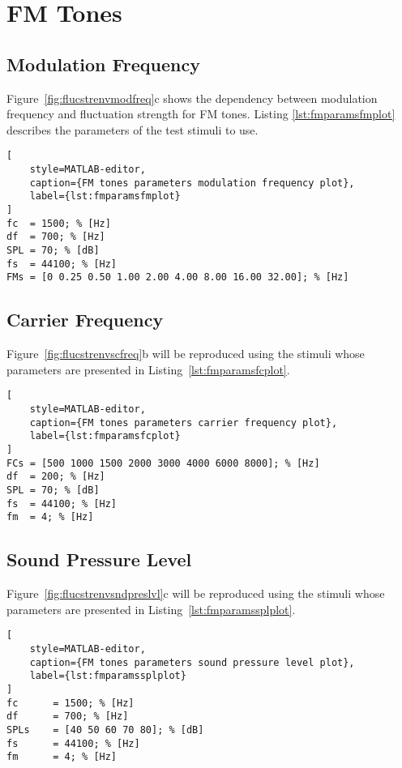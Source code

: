 \documentclass[a4paper]{article}
\begin{document}
\section{FM Tones}

\subsection{Modulation Frequency}

Figure~\ref{fig:flucstrenvmodfreq}c shows the dependency between modulation
frequency and fluctuation strength for FM tones. Listing
\ref{lst:fmparamsfmplot} describes the parameters of the test stimuli to use.

\begin{lstlisting}[
    style=MATLAB-editor,
    caption={FM tones parameters modulation frequency plot},
    label={lst:fmparamsfmplot}
]
fc  = 1500; % [Hz]
df  = 700; % [Hz]
SPL = 70; % [dB]
fs  = 44100; % [Hz]
FMs = [0 0.25 0.50 1.00 2.00 4.00 8.00 16.00 32.00]; % [Hz]
\end{lstlisting}

\subsection{Carrier Frequency}

Figure~\ref{fig:flucstrenvscfreq}b will be reproduced using the stimuli whose
parameters are presented in Listing~\ref{lst:fmparamsfcplot}.

\begin{lstlisting}[
    style=MATLAB-editor,
    caption={FM tones parameters carrier frequency plot},
    label={lst:fmparamsfcplot}
]
FCs = [500 1000 1500 2000 3000 4000 6000 8000]; % [Hz]
df  = 200; % [Hz]
SPL = 70; % [dB]
fs  = 44100; % [Hz]
fm  = 4; % [Hz]
\end{lstlisting}

\subsection{Sound Pressure Level}

Figure~\ref{fig:flucstrenvsndpreslvl}c will be reproduced using the stimuli
whose parameters are presented in Listing~\ref{lst:fmparamssplplot}.

\begin{lstlisting}[
    style=MATLAB-editor,
    caption={FM tones parameters sound pressure level plot},
    label={lst:fmparamssplplot}
]
fc      = 1500; % [Hz]
df      = 700; % [Hz]
SPLs    = [40 50 60 70 80]; % [dB]
fs      = 44100; % [Hz]
fm      = 4; % [Hz]
\end{lstlisting}
\end{document}
